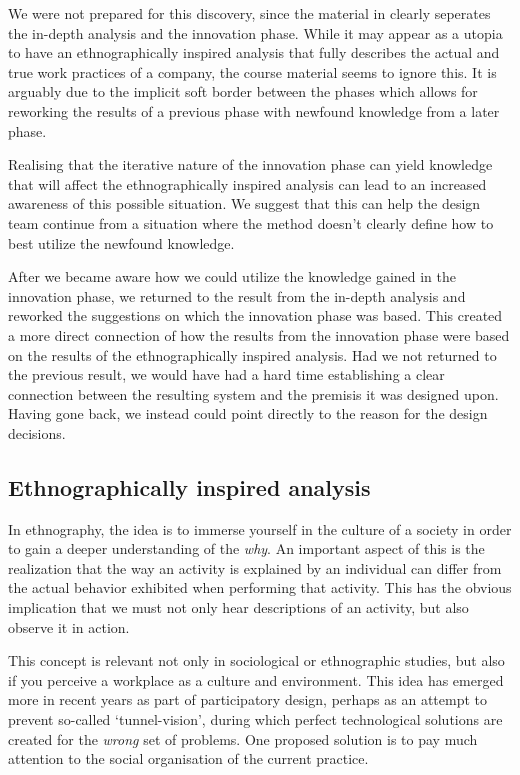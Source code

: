 We were not prepared for this discovery, since the material in 
\cite{bodker2004participatory} clearly seperates the in-depth analysis and the 
innovation phase. While it may appear as a utopia to have an ethnographically inspired analysis
that fully describes the actual and true work practices of a company, the course 
material seems to ignore this. It is arguably due to the implicit soft border
between the phases which allows for reworking the results of a previous phase with
newfound knowledge from a later phase.

Realising that the iterative nature of the innovation phase can yield knowledge that
will affect the ethnographically inspired analysis can lead to an increased 
awareness of this possible situation. We suggest that this can help the design team 
continue from a situation where the method doesn't clearly define how to best
utilize the newfound knowledge.

After we became aware how we could utilize the knowledge gained in the innovation 
phase, we returned to the result from the in-depth analysis and reworked the 
suggestions on which the innovation phase was based. This created a more direct
connection of how the results from the innovation phase were based on the 
results of the ethnographically inspired analysis. Had we not returned to the previous
result, we would have had a hard time establishing a clear connection between the 
resulting system and the premisis it was designed upon. Having gone back, we instead 
could point directly to the reason for the design decisions.

\subsection{Ethnographically inspired analysis}
In ethnography, the idea is to immerse yourself in the culture of a
society in order to gain a deeper understanding of the \textit{why}. An
important aspect of this is the realization that the way an activity is explained by an
individual can differ from the actual behavior exhibited when performing that
activity. This has the obvious implication that we must not only hear
descriptions of an activity, but also observe it in action\cite{simonsen1997using}.

This concept is relevant not only in sociological or ethnographic studies, but also if
you perceive a workplace as a culture and environment. This idea has emerged more in recent
years as part of participatory design\cite{crabtree1998ethnography}, perhaps as an attempt to
prevent so-called `tunnel-vision', during which perfect technological solutions are created for
the \textit{wrong} set of problems\cite{sol1984prototyping}. One proposed solution is to pay much
attention to the social organisation of the current 
practice\cite{hughes1994moving, crabtree1998ethnography, simonsen1997using, bodker2004participatory}.

